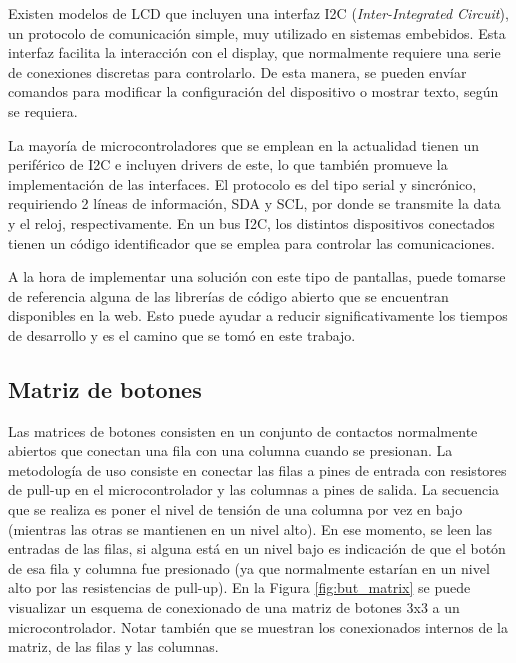 
Existen modelos de LCD que incluyen una interfaz I2C (\textit{Inter-Integrated Circuit}), un protocolo de comunicación simple, muy utilizado en sistemas embebidos. Esta interfaz facilita la interacción con el display, que normalmente requiere una serie de conexiones discretas para controlarlo. De esta manera, se pueden envíar comandos para modificar la configuración del dispositivo o mostrar texto, según se requiera.

La mayoría de microcontroladores que se emplean en la actualidad tienen un periférico de I2C e incluyen drivers de este, lo que también promueve la implementación de las interfaces. El protocolo es del tipo serial y sincrónico, requiriendo 2 líneas de información, SDA y SCL, por donde se transmite la data y el reloj, respectivamente. En un bus I2C, los distintos dispositivos conectados tienen un código identificador que se emplea para controlar las comunicaciones.

A la hora de implementar una solución con este tipo de pantallas, puede tomarse de referencia alguna de las librerías de código abierto que se encuentran disponibles en la web. Esto puede ayudar a reducir significativamente los tiempos de desarrollo y es el camino que se tomó en este trabajo.

\subsection{Matriz de botones}

Las matrices de botones consisten en un conjunto de contactos normalmente abiertos que conectan una fila con una columna cuando se presionan. La metodología de uso consiste en conectar las filas a pines de entrada con resistores de pull-up en el microcontrolador y las columnas a pines de salida. La secuencia que se realiza es poner el nivel de tensión de una columna por vez en bajo (mientras las otras se mantienen en un nivel alto). En ese momento, se leen las entradas de las filas, si alguna está en un nivel bajo es indicación de que el botón de esa fila y columna fue presionado (ya que normalmente estarían en un nivel alto por las resistencias de pull-up)\citep{Arduino_Cookbook}. En la Figura \ref{fig:but_matrix} se puede visualizar un esquema de conexionado de una matriz de botones 3x3 a un microcontrolador. Notar también que se muestran los conexionados internos de la matriz, de las filas y las columnas.

